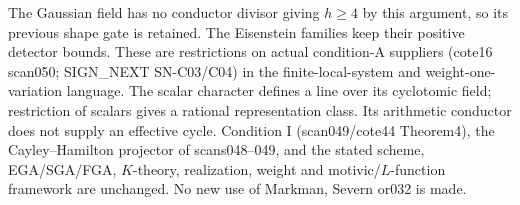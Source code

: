 The Gaussian field has no conductor divisor giving $h\ge4$ by this
argument, so its previous shape gate is retained. The Eisenstein
families keep their positive detector bounds. These are restrictions
on actual condition-A suppliers (cote16 scan050; SIGN\_NEXT SN-C03/C04)
in the finite-local-system and weight-one-variation language.
The scalar character defines a line over its cyclotomic field;
restriction of scalars gives a rational representation class.
Its arithmetic conductor does not supply an effective cycle.
Condition I (scan049/cote44 Theorem4), the Cayley--Hamilton projector
of scans048--049, and the stated scheme, EGA/SGA/FGA, $K$-theory,
realization, weight and motivic/$L$-function framework are unchanged.
No new use of Markman, Severn or032 is made.

